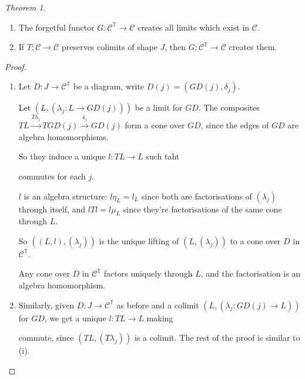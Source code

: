 \documentclass[a4paper]{article}
\theoremstyle{definition}
\theoremstyle{remark}
\theoremstyle{default}
\newtheorem{theorem}[definition]{Theorem}
\numberwithin{definition}{section}
\begin{document}
\begin{theorem}
	\begin{enumerate}[label=\roman*.]
		\item The forgetful functor $G: \mathcal{C}^\mathbb{T} \to \mathcal{C}$ creates all limits which exist in $\mathcal{C}$.
		\item If $T: \mathcal{C} \to \mathcal{C}$ preserves colimits of shape $J$,
		then $G: \mathcal{C}^\mathbb{T} \to \mathcal{C}$ creates them.
	\end{enumerate}
	\label{58}
\end{theorem}
\begin{proof}
	\begin{enumerate}[label=\roman*.]
		\item 
		Let $D: J \to \mathcal{C}^\mathbb{T}$ be a diagram,
		write $D(j) = (GD(j), \delta_j)$.
		
		Let $(L, (\lambda_j : L \to GD(j)))$ be a limit for $GD$.
		The composites $TL \overset{T\lambda_j}{\to} TGD(j) \overset{\delta_j}{\to} GD(j)$
		form a cone over $GD$,
		since the edges of $GD$ are algebra homomorphisms.
		
		So they induce a unique $l: TL \to L$ such taht
		\begin{center}
		\end{center}
		commutes for each $j$.
		
		$l$ is an algebra structure:
		$l\eta_L = l_L$ since both are factorisations of $(\lambda_j)$ through itself,
		and $lTl = l\mu_L$ since they're factorisations of the same cone through $L$.
		
		So $((L,l), (\lambda_j))$ is the unique lifting of $(L, (\lambda_j))$ to a cone over $D$ in $\mathcal{C}^\mathbb{T}$.
		
		Any cone over $D$ in $\mathcal{C}^\mathbb{T}$ factors uniquely through $L$,
		and the factorisation is an algebra homomorphism.
		
		\item
		Similarly, given $D:J \to \mathcal{C}^\mathbb{T}$ as before and a colimit $(L, (\lambda_j: GD(j) \to L))$ for $GD$,
		we get a unique $l: TL \to L$ making
		\begin{center}
		\end{center}
		commute, since $(TL, (T\lambda_j))$ is a colimit.
		The rest of the proof is similar to (i).
	\end{enumerate}
\end{proof}
\end{document}
